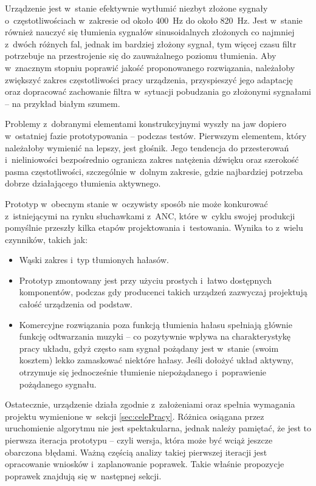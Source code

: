 Urządzenie jest w~stanie efektywnie wytłumić niezbyt złożone sygnały o~częstotliwościach w~zakresie od około \SI{400}{\Hz} do około \SI{820}{\Hz}. Jest w~stanie również nauczyć się tłumienia sygnałów sinusoidalnych złożonych co najmniej z~dwóch różnych fal, jednak im bardziej złożony sygnał, tym więcej czasu filtr potrzebuje na przestrojenie się do zauważalnego poziomu tłumienia. Aby w~znacznym stopniu poprawić jakość proponowanego rozwiązania, należałoby zwiększyć zakres częstotliwości pracy urządzenia, przyspieszyć jego adaptację oraz dopracować zachowanie filtra w~sytuacji pobudzania go złożonymi sygnałami -- na przykład białym szumem.

Problemy z~dobranymi elementami konstrukcyjnymi wyszły na jaw dopiero w~ostatniej fazie prototypowania -- podczas testów. Pierwszym elementem, który należałoby wymienić na lepszy, jest głośnik. Jego tendencja do przesterowań i~nieliniowości bezpośrednio ogranicza zakres natężenia dźwięku oraz szerokość pasma częstotliwości, szczególnie w~dolnym zakresie, gdzie najbardziej potrzeba dobrze działającego tłumienia aktywnego.

Prototyp w~obecnym stanie w~oczywisty sposób nie może konkurować z~istniejącymi na rynku słuchawkami z~ANC, które w~cyklu swojej produkcji pomyślnie przeszły kilka etapów projektowania i~testowania. Wynika to z~wielu czynników, takich jak:
\begin{itemize}
	\item Wąski zakres i~typ tłumionych hałasów.
	\item Prototyp zmontowany jest przy użyciu prostych i~łatwo dostępnych komponentów, podczas gdy producenci takich urządzeń zazwyczaj projektują całość urządzenia od podstaw.
	\item Komercyjne rozwiązania poza funkcją tłumienia hałasu spełniają głównie funkcję odtwarzania muzyki -- co pozytywnie wpływa na charakterystykę pracy układu, gdyż często sam sygnał pożądany jest w~stanie (swoim kosztem) lekko zamaskować niektóre hałasy. Jeśli dołożyć układ aktywny, otrzymuje się jednocześnie tłumienie niepożądanego i~poprawienie pożądanego sygnału.
\end{itemize}

Ostatecznie, urządzenie działa zgodnie z~założeniami oraz spełnia wymagania projektu wymienione w~sekcji \ref{sec:celePracy}. Różnica osiągana przez uruchomienie algorytmu nie jest spektakularna, jednak należy pamiętać, że jest to pierwsza iteracja prototypu -- czyli wersja, która może być wciąż jeszcze obarczona błędami. Ważną częścią analizy takiej pierwszej iteracji jest opracowanie wniosków i~zaplanowanie poprawek. Takie właśnie propozycje poprawek znajdują się w~następnej sekcji.
